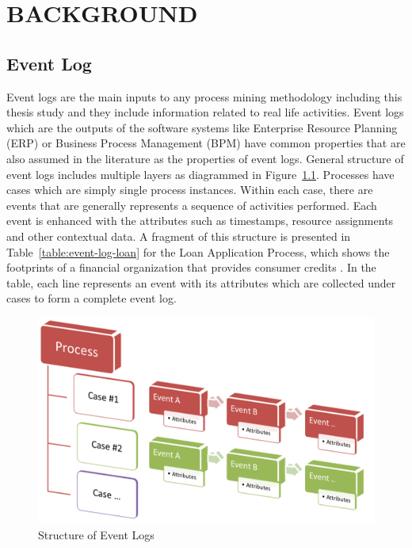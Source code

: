 
\chapter{BACKGROUND}
\label{chp:background}

\section{Event Log}
\label{sec:event-log}
Event logs are the main inputs to any process mining methodology including this thesis study and they include information related to real life activities. Event logs which are the outputs of the software systems like Enterprise Resource Planning (ERP) or Business Process Management (BPM) have common properties that are also assumed in the literature as the properties of event logs. General structure of event logs includes multiple layers as diagrammed in Figure~\ref{fig:event-log-structure}. Processes have cases which are simply single process instances. Within each case, there are events that are generally represents a sequence of activities performed. Each event is enhanced with the attributes such as timestamps, resource assignments and other contextual data. A fragment of this structure is presented in Table~\ref{table:event-log-loan} for the Loan Application Process\cite{loan-app-data}, which shows the footprints of a financial organization that provides consumer credits \cite{buijs2013improving}. In the table, each line represents an event with its attributes which are collected under cases to form a complete event log. 
\begin{figure}
  \centering
  \includegraphics[width=\textwidth]{3_background/event_log_structure}
  \caption{Structure of Event Logs}
  \label{fig:event-log-structure}
\end{figure}

